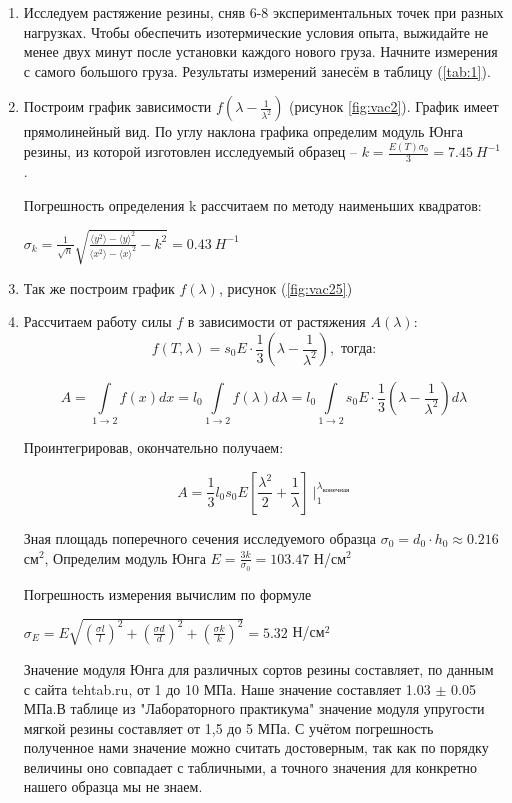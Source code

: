 \documentclass[a4paper,11.5pt]{article} %
\begin{document}
\begin{enumerate}
    \item Исследуем растяжение резины, сняв 6-8 экспериментальных точек при разных нагрузках. Чтобы обеспечить изотермические условия опыта,
выжидайте не менее двух минут после установки каждого нового груза. Начните измерения с самого большого груза. Результаты измерений занесём в таблицу (\ref{tab:1}).

\item Построим график зависимости $f(\lambda - \frac{1}{\lambda^2})$ (рисунок \ref{fig:vac2}). График имеет прямолинейный вид. По углу наклона графика определим модуль Юнга резины, из которой изготовлен исследуемый образец -- $k = \frac{E(T)\sigma_0}{3} = 7.45 \ H^{-1} $.

Погрешность определения k рассчитаем по методу наименьших квадратов:
\begin{center} 
$\sigma_k = \frac{1}{\sqrt{n}}\sqrt{\frac{\langle y^2 \rangle - \langle y \rangle ^2}{\langle x^2 \rangle - \langle x \rangle ^2} - k^2} = 0.43\ H^{-1}$
\end{center}

\item Так же построим график $f(\lambda)$, рисунок (\ref{fig:vac25})

\item Рассчитаем работу силы $f$ в зависимости от растяжения $A(\lambda)$:
\[ f(T, \lambda)=s_{0} E \cdot \frac{1}{3}\left(\lambda-\frac{1}{\lambda^{2}}\right), \text{ тогда:}\]

\[A = \int\limits_{1\rightarrow 2} f(x)dx = l_0 \int\limits_{1\rightarrow 2} f(\lambda)  d \lambda = l_0 \int\limits_{1\rightarrow 2} s_{0} E \cdot \frac{1}{3}\left(\lambda-\frac{1}{\lambda^{2}}\right) d\lambda\]

Проинтегрировав, окончательно получаем: 

\begin{center}
\begin{equation}
A = \frac{1}{3}l_0s_0E \left[\frac{\lambda^2}{2} + \frac{1}{\lambda} \right]\ |_{1}^{\lambda_{\text{конечная}}}
\end{equation}
\end{center}

Зная площадь поперечного сечения исследуемого образца $\sigma_0 = d_0\cdot h_0 \approx 0.216$ см$^2$, Определим модуль Юнга $E = \frac{3k}{\sigma_0} = 103.47$ Н/см$^2$

Погрешность измерения вычислим по формуле
\begin{center}
$\sigma_E = E\sqrt{(\frac{\sigma l}{l})^2 + (\frac{\sigma d}{d})^2 + (\frac{\sigma k}{k})^2} = 5.32$ Н/см$^2$
\end{center}

Значение модуля Юнга для различных сортов резины составляет, по данным с сайта tehtab.ru, от 1 до 10 МПа. Наше значение составляет 1.03 $\pm$ 0.05 МПа.В таблице из "Лабораторного практикума" значение модуля упругости мягкой резины составляет от 1,5 до 5 МПа. С учётом погрешность полученное нами значение можно считать достоверным, так как по порядку величины оно совпадает с табличными, а точного значения для конкретно нашего образца мы не знаем.

\end{enumerate}
\end{document}
